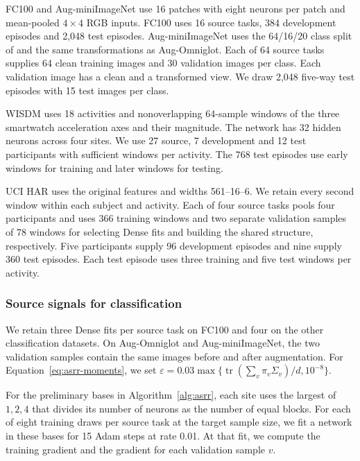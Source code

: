 FC100 and Aug-miniImageNet use 16 patches with eight neurons per patch
and mean-pooled $4\times4$ RGB inputs. FC100 uses 16 source tasks,
384 development episodes and 2,048 test episodes. Aug-miniImageNet
uses the 64/16/20 class split of \citet{ravi2017optimization} and the
same transformations as Aug-Omniglot. Each of 64 source tasks supplies
64 clean training images and 30 validation images per class. Each
validation image has a clean and a transformed view. We draw 2,048
five-way test episodes with 15 test images per class.

WISDM uses 18 activities and nonoverlapping 64-sample windows of the
three smartwatch acceleration axes and their magnitude. The network
has 32 hidden neurons across four sites. We use 27 source, 7
development and 12 test participants with sufficient windows per
activity. The 768 test episodes use early windows for training and
later windows for testing.

UCI HAR uses the original features and widths 561--16--6. We retain
every second window within each subject and activity. Each of four
source tasks pools four participants and uses 366 training windows
and two separate validation samples of 78 windows for selecting Dense
fits and building the shared structure, respectively. Five participants supply 96
development episodes and nine supply 360 test episodes. Each test
episode uses three training and five test windows per activity.

\subsubsection{Source signals for classification}

We retain three Dense fits per source task on FC100 and four on the
other classification datasets. On Aug-Omniglot and Aug-miniImageNet,
the two validation samples contain the same images before and after
augmentation. For Equation~\eqref{eq:asrr-moments}, we set
$\varepsilon=0.03\max\{\operatorname{tr}(\sum_v\pi_v\Sigma_v)/d,10^{-8}\}$.

For the preliminary bases in Algorithm~\ref{alg:asrr}, each site
uses the largest of $1,2,4$ that divides its number of neurons as the
number of equal blocks. For each of eight training draws per source
task at the target sample size, we fit a network in these bases for
15 Adam steps at rate 0.01. At that fit, we compute the training
gradient and the gradient for each validation sample $v$.

